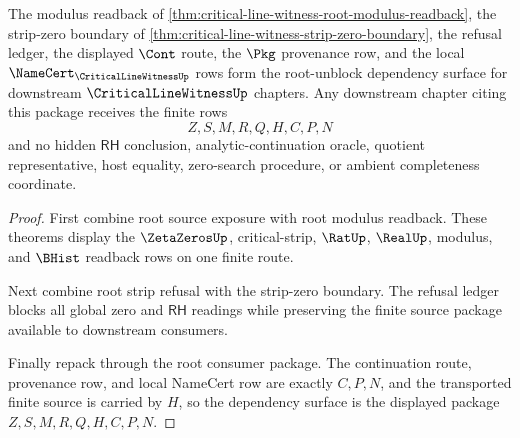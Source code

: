 \begin{theorem}
\label{thm:critical-line-witness-root-unblock-package}
The modulus readback of \autoref{thm:critical-line-witness-root-modulus-readback}, the strip-zero boundary of \autoref{thm:critical-line-witness-strip-zero-boundary}, the refusal ledger, the displayed $\Cont$ route, the $\Pkg$ provenance row, and the local $\NameCert_{\CriticalLineWitnessUp}$ rows form the root-unblock dependency surface for downstream $\CriticalLineWitnessUp$ chapters. Any downstream chapter citing this package receives the finite rows
$$
Z,S,M,R,Q,H,C,P,N
$$
and no hidden $\mathsf{RH}$ conclusion, analytic-continuation oracle, quotient representative, host equality, zero-search procedure, or ambient completeness coordinate.
\end{theorem}
\begin{proof}
First combine root source exposure with root modulus readback. These theorems display the $\ZetaZerosUp$, critical-strip, $\RatUp$, $\RealUp$, modulus, and $\BHist$ readback rows on one finite route.

Next combine root strip refusal with the strip-zero boundary. The refusal ledger blocks all global zero and $\mathsf{RH}$ readings while preserving the finite source package available to downstream consumers.

Finally repack through the root consumer package. The continuation route, provenance row, and local NameCert row are exactly $C,P,N$, and the transported finite source is carried by $H$, so the dependency surface is the displayed package $Z,S,M,R,Q,H,C,P,N$.
\end{proof}
